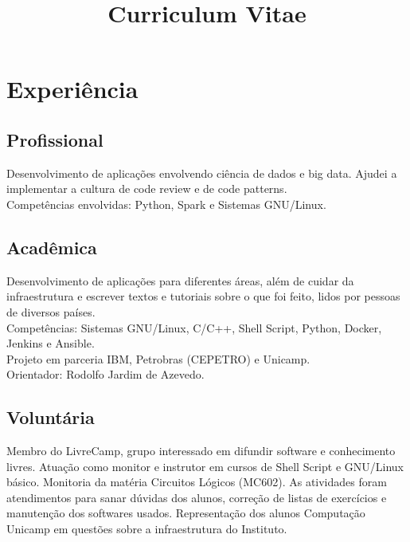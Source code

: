 \documentclass[10pt, a4paper, roman]{moderncv} %
\title{Curriculum Vitae}
\begin{document}
\makecvtitle %

\section{Experiência}

\subsection{Profissional}

{
    Desenvolvimento de aplicações envolvendo ciência de dados e big data. Ajudei a implementar 
    a cultura de code review e de code patterns.\\
    Competências envolvidas: Python, Spark e Sistemas GNU/Linux.
}

\subsection{Acadêmica}
{
    Desenvolvimento de aplicações para diferentes áreas, além de cuidar da infraestrutura e escrever textos e tutoriais sobre o que foi 
    feito, lidos por pessoas de diversos países.\\ 
    Competências: Sistemas GNU/Linux, C/C++, Shell Script, Python, Docker, Jenkins e Ansible.\\ 
    Projeto em parceria IBM, Petrobras (CEPETRO) e Unicamp.\\
    Orientador: Rodolfo Jardim de Azevedo.
}


\subsection{Voluntária}
{
    Membro do LivreCamp, grupo interessado em difundir software e conhecimento livres. Atuação
    como monitor e instrutor em cursos de Shell Script e GNU/Linux básico.
}
{
    Monitoria da matéria Circuitos Lógicos (MC602). As atividades foram atendimentos para sanar dúvidas 
    dos alunos, correção de listas de exercícios e manutenção dos softwares usados.
}
{
Representação dos alunos Computação Unicamp em questões sobre a 
    infraestrutura do Instituto.
}
\end{document}
